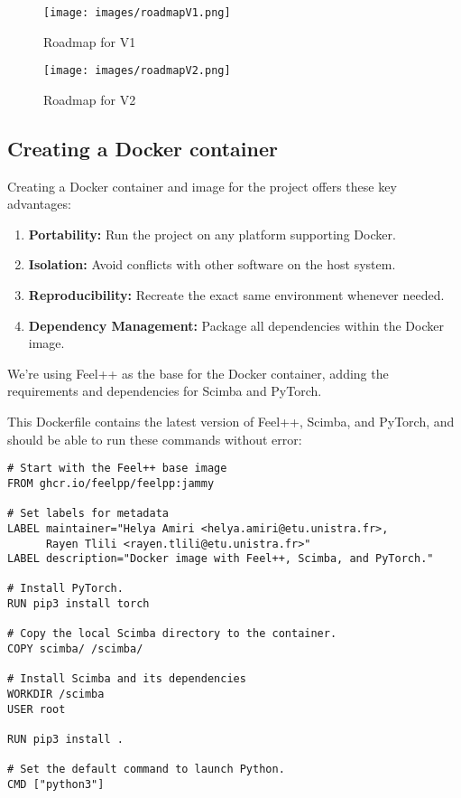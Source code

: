\documentclass[12pt]{article}
\begin{document}
\begin{figure}[H]
    \centering
    \texttt{[image: images/roadmapV1.png]}
    \caption{Roadmap for V1}
\end{figure}

\begin{figure}[H]
    \centering
    \texttt{[image: images/roadmapV2.png]}
    \caption{Roadmap for V2}
\end{figure}

\newpage 

\subsection{Creating a Docker container}
Creating a Docker container and image for the project offers these key advantages:

\begin{enumerate}
    \item \textbf{Portability:} Run the project on any platform supporting Docker.
    \item \textbf{Isolation:} Avoid conflicts with other software on the host system.
    \item \textbf{Reproducibility:} Recreate the exact same environment whenever needed.
    \item \textbf{Dependency Management:} Package all dependencies within the Docker image.
    \\
\end{enumerate}


We're using Feel++ as the base for the Docker container, adding the requirements and dependencies for Scimba and PyTorch.

This Dockerfile contains the latest version of Feel++, Scimba, and PyTorch, and should be able to run these commands without error:
\\
\begin{lstlisting}[language=docker,caption={Dockerfile for Feel++, Scimba, and PyTorch},frame=single, backgroundcolor=\color{gray!10}, basicstyle=\footnotesize,rulecolor=\color{blue}, framexleftmargin=3pt, commentstyle=\color{mygreen}, keywordstyle=\color{blue}]
# Start with the Feel++ base image
FROM ghcr.io/feelpp/feelpp:jammy

# Set labels for metadata
LABEL maintainer="Helya Amiri <helya.amiri@etu.unistra.fr>,
      Rayen Tlili <rayen.tlili@etu.unistra.fr>"
LABEL description="Docker image with Feel++, Scimba, and PyTorch."

# Install PyTorch.
RUN pip3 install torch

# Copy the local Scimba directory to the container.
COPY scimba/ /scimba/

# Install Scimba and its dependencies
WORKDIR /scimba
USER root

RUN pip3 install .

# Set the default command to launch Python.
CMD ["python3"]
\end{lstlisting}
\end{document}
